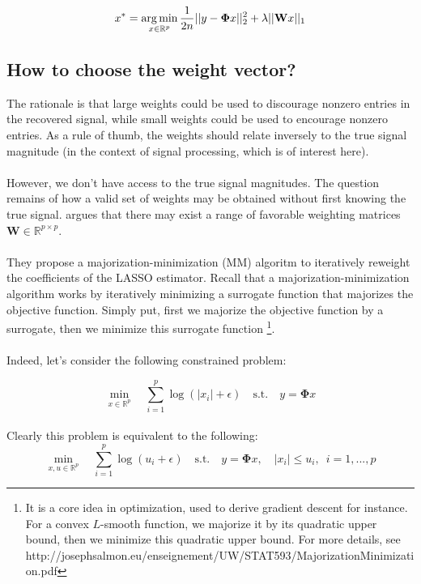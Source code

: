 \documentclass[a4paper,10pt]{article}
\theoremstyle{definition}
\begin{document}
\begin{equation*}
    x^* = \operatorname*{arg\,min}_{x \in \mathbb{R}^p} \frac{1}{2n} \lvert\lvert y - \mathbf{\Phi}x \rvert\rvert_2^2 + \lambda \lvert\vert \mathbf{W}x \rvert\rvert_1
\end{equation*}

\subsection*{How to choose the weight vector?}

The rationale is that large weights could be used to discourage nonzero entries in the recovered signal, while small weights could be used to encourage nonzero entries. As a rule of thumb, the weights should relate inversely
to the true signal magnitude (in the context of signal processing, which is of interest here).
\\
\\
However, we don't have access to the true signal magnitudes. The question remains of how a valid set of weights may be obtained without first knowing the true signal. \cite{Candes_Wakin_Boyd08} argues that there may exist a range of
favorable weighting matrices $\mathbf{W} \in \mathbb{R}^{p \times p}$.
\\
\\
They propose a majorization-minimization (MM) algoritm to iteratively reweight the coefficients of the LASSO estimator. Recall that a majorization-minimization algorithm works by iteratively minimizing a surrogate function that majorizes the
objective function. Simply put, first we majorize the objective function by a surrogate, then we minimize this surrogate function \footnote{It is a core idea in optimization, used to derive gradient descent for instance. For a convex $L$-smooth function,
we majorize it by its quadratic upper bound, then we minimize this quadratic upper bound. For more details, see http://josephsalmon.eu/enseignement/UW/STAT593/MajorizationMinimization.pdf}.
\\
\\
Indeed, let's consider the following constrained problem:

\begin{equation*}
    \min_{x \in \mathbb{R}^p} \quad  \sum_{i=1}^p \log(\lvert x_i \rvert + \epsilon) \quad \textrm{s.t.} \quad  y = \mathbf{\Phi} x
\end{equation*}
\\

Clearly this problem is equivalent to the following:
\begin{equation*}
    \min_{x,u \in \mathbb{R}^p} \quad  \sum_{i=1}^p \log(u_i + \epsilon) \quad \textrm{s.t.} \quad  y = \mathbf{\Phi} x, \quad \lvert x_i \rvert \leq u_i, \enspace i=1,...,p
\end{equation*}
\end{document}
